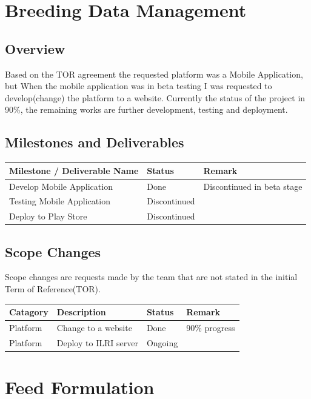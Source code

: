 \documentclass[12pt]{extarticle}
\begin{document}
\section{Breeding Data Management}

\subsection{Overview}
Based on the TOR agreement the requested platform was a Mobile Application, but When the mobile application was in beta testing I was requested to develop(change) the platform to a website. Currently the status of the project in 90\%, the remaining works are further development, testing and deployment.

\subsection{Milestones and Deliverables}
\begin{center}
\begin{tabular}{ |p{7cm}|p{3cm}|p{4cm}| } 
\hline
\textbf{Milestone / Deliverable Name} & \textbf{Status} & \textbf{Remark}  \\
\hline
Develop Mobile Application &  Done & Discontinued in beta stage \\
\hline
Testing Mobile Application &  Discontinued & \\
\hline
Deploy to Play Store &  Discontinued & \\
\hline
\end{tabular}
\end{center}

\subsection{Scope Changes}
Scope changes are requests made by the team that are not stated in the initial Term of Reference(TOR).
\begin{center}
\begin{tabular}{ |p{2cm}|p{7cm}|p{3cm}|p{2cm}| } 
\hline
\textbf{Catagory} & \textbf{Description} & \textbf{Status} & \textbf{Remark}  \\
\hline
Platform & Change to a website & Done & 90\% progress \\
\hline
Platform & Deploy to ILRI server & Ongoing & \\
\hline
\end{tabular}
\end{center}

\section{Feed Formulation}
\end{document}
